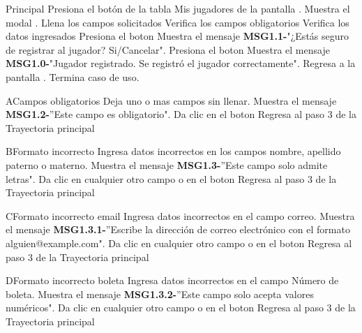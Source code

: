 	\newpage
	\begin{UCtrayectoria}{Principal}
	\UCpaso[\UCactor] Presiona el botón \IUbutton{ + } de la tabla Mis jugadores de la pantalla .
	\UCpaso Muestra el modal . 
	\UCpaso[\UCactor] Llena los campos solicitados
	\UCpaso Verifica los campos obligatorios  
	\UCpaso Verifica los datos ingresados      
	\UCpaso[\UCactor] Presiona el boton  
	\UCpaso Muestra el mensaje {\bf MSG1.1-}"¿Estás seguro de registrar al jugador? Si/Cancelar".
	\UCpaso[\UCactor] Presiona el boton  
	\UCpaso Muestra el mensaje {\bf MSG1.0-}"Jugador registrado. Se registró el jugador correctamente".
	\UCpaso Regresa a la pantalla .
	\UCpaso Termina caso de uso.
\end{UCtrayectoria}

\begin{UCtrayectoriaA}{A}{Campos obligatorios}
	\UCpaso[\UCactor] Deja uno o mas campos sin llenar.
	\UCpaso Muestra el mensaje {\bf MSG1.2-}''Este campo es obligatorio".
	\UCpaso[\UCactor] Da clic en el boton 
	\UCpaso Regresa al paso 3 de la Trayectoria principal
\end{UCtrayectoriaA}

\begin{UCtrayectoriaA}{B}{Formato incorrecto}
	\UCpaso[\UCactor] Ingresa datos incorrectos en los campos nombre, apellido paterno o materno.
	\UCpaso Muestra el mensaje {\bf MSG1.3-}''Este campo solo admite letras".
	\UCpaso[\UCactor] Da clic en cualquier otro campo o en el boton 
	\UCpaso Regresa al paso 3 de la Trayectoria principal
\end{UCtrayectoriaA}

\begin{UCtrayectoriaA}{C}{Formato incorrecto email}
	\UCpaso[\UCactor] Ingresa datos incorrectos en el campo correo.
	\UCpaso Muestra el mensaje {\bf MSG1.3.1-}''Escribe la dirección de correo electrónico con el formato alguien@example.com".
	\UCpaso[\UCactor] Da clic en cualquier otro campo o en el boton 
	\UCpaso Regresa al paso 3 de la Trayectoria principal
\end{UCtrayectoriaA}

\begin{UCtrayectoriaA}{D}{Formato incorrecto boleta}
	\UCpaso[\UCactor] Ingresa datos incorrectos en el campo Número de boleta.
	\UCpaso Muestra el mensaje {\bf MSG1.3.2-}''Este campo solo acepta valores numéricos".
	\UCpaso[\UCactor] Da clic en cualquier otro campo o en el boton 
	\UCpaso Regresa al paso 3 de la Trayectoria principal
\end{UCtrayectoriaA}

